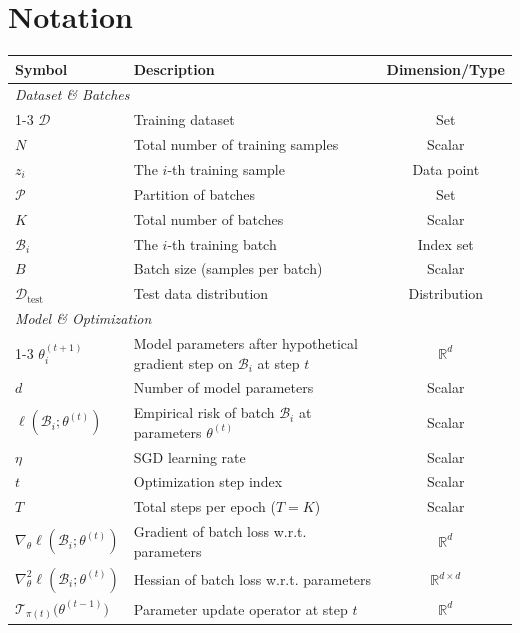 \clearpage
\section{Notation}

\label{sec:notation}
\begin{table}[H]
\centering
\small
\begin{tabularx}{0.85\linewidth}{lXc}
\toprule
\textbf{Symbol} & \textbf{Description} & \textbf{Dimension/Type} \\
\midrule
\multicolumn{3}{l}{\textit{Dataset \& Batches}} \\
\cmidrule{1-3}
$\mathcal{D}$ & Training dataset & Set \\
$N$ & Total number of training samples & Scalar \\
$z_i$ & The $i$-th training sample & Data point \\
$\mathcal{P}$ & Partition of batches & Set \\
$K$ & Total number of batches & Scalar \\
$\mathcal{B}_i$ & The $i$-th training batch & Index set \\
$B$ & Batch size (samples per batch) & Scalar \\
$\mathcal{D}_{\text{test}}$ & Test data distribution & Distribution \\
\midrule
\multicolumn{3}{l}{\textit{Model \& Optimization}} \\
\cmidrule{1-3}
$\theta_i^{(t+1)}$ & Model parameters after hypothetical gradient step on $\mathcal{B}_i$ at step $t$ & $\mathbb{R}^d$ \\
$d$ & Number of model parameters & Scalar \\
$\ell(\mathcal{B}_i; \theta^{(t)})$ & Empirical risk of batch $\mathcal{B}_i$ at parameters $\theta^{(t)}$ & Scalar \\
$\eta$ & SGD learning rate & Scalar \\
$t$ & Optimization step index & Scalar \\
$T$ & Total steps per epoch ($T = K$) & Scalar \\
$\nabla_{\!\theta} \ell(\mathcal{B}_i; \theta^{(t)})$ & Gradient of batch loss w.r.t. parameters & $\mathbb{R}^d$ \\
$\nabla^2_{\!\theta} \ell(\mathcal{B}_i; \theta^{(t)})$ & Hessian of batch loss w.r.t. parameters & $\mathbb{R}^{d\times d}$ \\
$\mathcal{T}_{\pi(t)}\bigl(\theta^{(t-1)}\bigr)$ & Parameter update operator at step $t$ & $\mathbb{R}^d$ \\

\end{tabularx}
\end{table}
